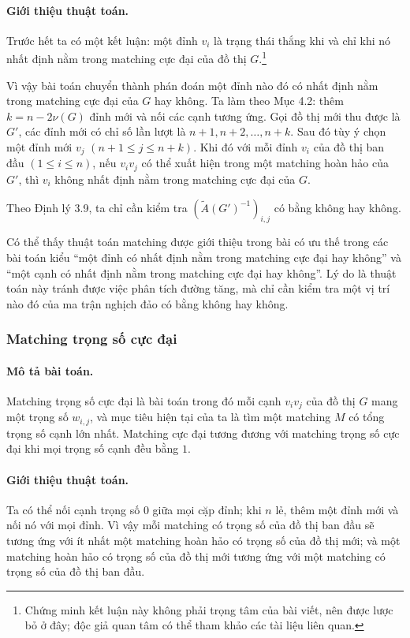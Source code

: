 \documentclass[11pt]{article}
\begin{document}
\paragraph{Giới thiệu thuật toán.}
Trước hết ta có một kết luận: một đỉnh \(v_i\) là trạng thái thắng khi và chỉ
khi nó nhất định nằm trong matching cực đại của đồ thị
\(G\).\footnote{Chứng minh kết luận này không phải trọng tâm của bài viết, nên
được lược bỏ ở đây; độc giả quan tâm có thể tham khảo các tài liệu liên quan.}

Vì vậy bài toán chuyển thành phán đoán một đỉnh nào đó có nhất định nằm trong
matching cực đại của \(G\) hay không. Ta làm theo Mục 4.2: thêm
\(k=n-2\nu(G)\) đỉnh mới và nối các cạnh tương ứng. Gọi đồ thị mới thu được là
\(G'\), các đỉnh mới có chỉ số lần lượt là
\(n+1,n+2,\ldots,n+k\). Sau đó tùy ý chọn một đỉnh mới \(v_j\)
\((n+1\le j\le n+k)\). Khi đó với mỗi đỉnh \(v_i\) của đồ thị ban đầu
\((1\le i\le n)\), nếu \(v_iv_j\) có thể xuất hiện trong một matching hoàn hảo
của \(G'\), thì \(v_i\) không nhất định nằm trong matching cực đại của \(G\).

Theo Định lý 3.9, ta chỉ cần kiểm tra \((\tilde A(G')^{-1})_{i,j}\) có bằng
không hay không.

Có thể thấy thuật toán matching được giới thiệu trong bài có ưu thế trong các
bài toán kiểu ``một đỉnh có nhất định nằm trong matching cực đại hay không''
và ``một cạnh có nhất định nằm trong matching cực đại hay không''. Lý do là
thuật toán này tránh được việc phân tích đường tăng, mà chỉ cần kiểm tra một
vị trí nào đó của ma trận nghịch đảo có bằng không hay không.

\subsubsection{Matching trọng số cực đại}

\paragraph{Mô tả bài toán.}
Matching trọng số cực đại là bài toán trong đó mỗi cạnh \(v_iv_j\) của đồ thị
\(G\) mang một trọng số \(w_{i,j}\), và mục tiêu hiện tại của ta là tìm một
matching \(M\) có tổng trọng số cạnh lớn nhất. Matching cực đại tương đương
với matching trọng số cực đại khi mọi trọng số cạnh đều bằng \(1\).

\paragraph{Giới thiệu thuật toán.}
Ta có thể nối cạnh trọng số \(0\) giữa mọi cặp đỉnh; khi \(n\) lẻ, thêm một
đỉnh mới và nối nó với mọi đỉnh. Vì vậy mỗi matching có trọng số của đồ thị
ban đầu sẽ tương ứng với ít nhất một matching hoàn hảo có trọng số của đồ thị
mới; và một matching hoàn hảo có trọng số của đồ thị mới tương ứng với một
matching có trọng số của đồ thị ban đầu.
\end{document}
